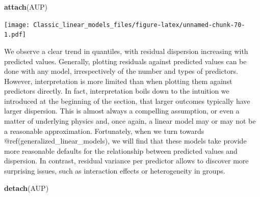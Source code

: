 \documentclass[]{svmono}
\newenvironment{Shaded}{\begin{snugshade}}{\end{snugshade}}
\newcommand{\KeywordTok}[1]{\textcolor[rgb]{0.13,0.29,0.53}{\textbf{#1}}}
\newcommand{\DataTypeTok}[1]{\textcolor[rgb]{0.13,0.29,0.53}{#1}}
\newcommand{\DecValTok}[1]{\textcolor[rgb]{0.00,0.00,0.81}{#1}}
\newcommand{\StringTok}[1]{\textcolor[rgb]{0.31,0.60,0.02}{#1}}
\newcommand{\OperatorTok}[1]{\textcolor[rgb]{0.81,0.36,0.00}{\textbf{#1}}}
\newcommand{\NormalTok}[1]{#1}
\theoremstyle{definition}
\theoremstyle{definition}
\theoremstyle{definition}
\theoremstyle{remark}
\begin{document}
\begin{Shaded}
\begin{Highlighting}[]
\KeywordTok{attach}\NormalTok{(AUP)}
\end{Highlighting}
\end{Shaded}

\begin{Shaded}
\end{Shaded}

\texttt{[image: Classic\_linear\_models\_files/figure-latex/unnamed-chunk-70-1.pdf]}

We observe a clear trend in quantiles, with residual dispersion
increasing with predicted values. Generally, plotting residuals against
predicted values can be done with any model, irrespectively of the
number and types of predictors. However, interpretation is more limited
than when plotting them against predictors directly. In fact,
interpretation boils down to the intuition we introduced at the
beginning of the section, that larger outcomes typically have larger
dispersion. This is almost always a compelling assumption, or even a
matter of underlying physics and, once again, a linear model may or may
not be a reasonable approximation. Fortunately, when we turn towards
@ref(generalized\_linear\_models), we will find that these models take
provide more reasonable defaults for the relationship between predicted
values and dispersion. In contrast, residual variance per predictor
allows to discover more surprising issues, such as interaction effects
or heterogeneity in groups.

\begin{Shaded}
\begin{Highlighting}[]
\KeywordTok{detach}\NormalTok{(AUP)}
\end{Highlighting}
\end{Shaded}
\end{document}
